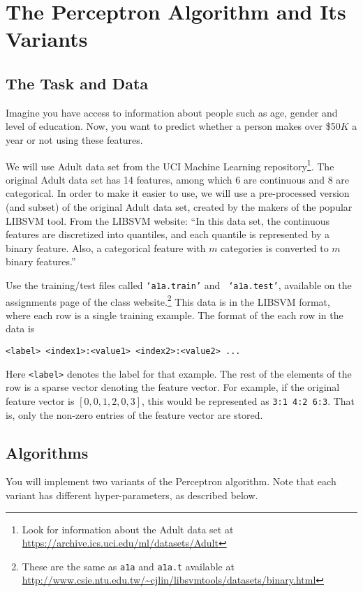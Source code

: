 \section{The Perceptron Algorithm and Its Variants}

\subsection{The Task and Data}
Imagine you have access to information about people such as age,
gender and level of education. Now, you want to predict whether a
person makes over \$50$K$ a year or not using these features.

We will use Adult data set from the UCI Machine Learning
repository\footnote{Look for information about the Adult data set at
  \url{https://archive.ics.uci.edu/ml/datasets/Adult}}. The original
Adult data set has 14 features, among which 6 are continuous and 8 are
categorical. In order to make it easier to use, we will use a
pre-processed version (and subset) of the original Adult data set,
created by the makers of the popular LIBSVM tool. From the LIBSVM
website: ``In this data set, the continuous features are discretized
into quantiles, and each quantile is represented by a binary feature.
Also, a categorical feature with $m$ categories is converted to $m$
binary features.''

Use the training/test files called {\tt `a1a.train'} and {\tt
  `a1a.test'}, available on the assignments page of the class
website.\footnote{These are the same as {\tt a1a} and {\tt a1a.t}
  available at
  \url{http://www.csie.ntu.edu.tw/~cjlin/libsvmtools/datasets/binary.html}}
This data is in the LIBSVM format, where each row is a single training
example. The format of the each row in the data is

{\tt <label> <index1>:<value1> <index2>:<value2> ...}

Here {\tt <label>} denotes the label for that example. The rest of the
elements of the row is a sparse vector denoting the feature vector.
For example, if the original feature vector is $[0, 0, 1, 2, 0, 3]$,
this would be represented as {\tt 3:1 4:2 6:3}. That is, only the
non-zero entries of the feature vector are stored.

\subsection{Algorithms}

You will implement two variants of the Perceptron algorithm. Note that
each variant has different hyper-parameters, as described below.

